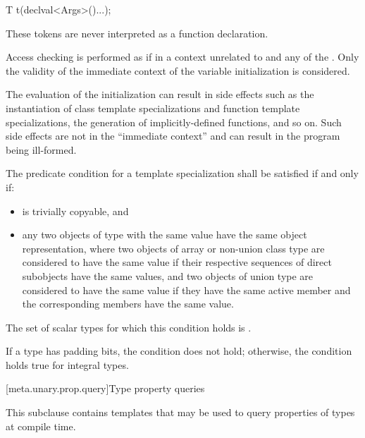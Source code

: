 \begin{codeblock}
T t(declval<Args>()...);
\end{codeblock}

\begin{note} These tokens are never interpreted as a function declaration.
\end{note} Access checking is performed as if in a context unrelated to 
and any of the . Only the validity of the immediate context of the
variable initialization is considered. \begin{note} The evaluation of the
initialization can result in side effects such as the instantiation of class
template specializations and function template specializations, the generation
of implicitly-defined functions, and so on. Such side effects are not in the
``immediate context'' and can result in the program being ill-formed. \end{note}

%
\pnum
The predicate condition for a template specialization
shall be satisfied if and only if:
\begin{itemize}
\item {} is trivially copyable, and
\item any two objects of type  with the same value
have the same object representation, where
two objects of array or non-union class type are considered to have the same value
if their respective sequences of direct subobjects have the same values, and
two objects of union type are considered to have the same value
if they have the same active member and the corresponding members have the same value.
\end{itemize}
The set of scalar types for which this condition holds is
.
\begin{note} If a type has padding bits, the condition does not hold;
otherwise, the condition holds true for integral types. \end{note}

[meta.unary.prop.query]{Type property queries}

\pnum
This subclause contains templates that may be used to query
properties of types at compile time.

